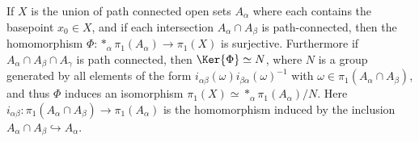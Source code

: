\begin{thm} If $X$ is the union of path connected open sets $A_\alpha$ where each contains the basepoint $x_0\in X$, and if each intersection $A_\alpha\cap A_\beta$ is path-connected, then the homomorphism $\Phi:*_\alpha \pi_1(A_\alpha)\rightarrow \pi_1(X)$ is surjective. Furthermore if $A_\alpha\cap A_\beta \cap A_\gamma$ is path connected, then $\Ker{\Phi}\simeq N$, where $N$ is a group generated by all elements of the form $i_{\alpha\beta}(\omega)i_{\beta\alpha}(\omega)^{-1}$ with $\omega\in \pi_1(A_\alpha\cap A_\beta)$, and thus $\Phi$ induces an isomorphism $\pi_1(X)\simeq *_\alpha \pi_1(A_\alpha)/N$. Here $i_{\alpha\beta}:\pi_1(A_\alpha\cap A_\beta)\rightarrow \pi_1(A_\alpha)$ is the homomorphism induced by the inclusion $A_\alpha\cap A_\beta\hookrightarrow A_\alpha$.
\end{thm}
